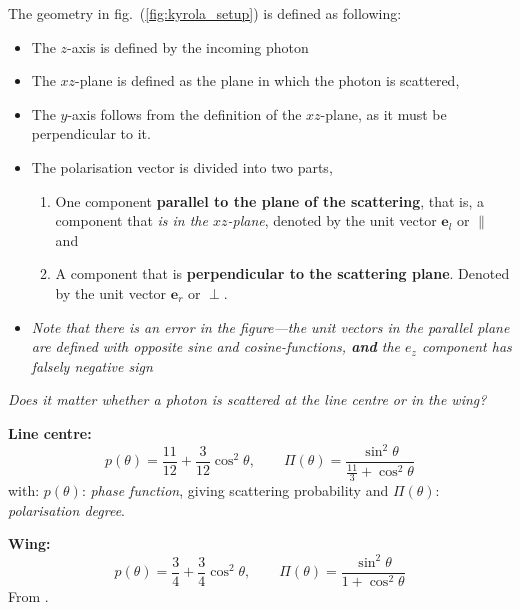 \documentclass[ignorenonframetext]{beamer}
\begin{document}
The geometry in fig.~(\ref{fig:kyrola_setup}) is defined as following:
\begin{itemize}
    \item The $z$-axis is defined by the incoming photon
    \item The $xz$-plane is defined as the plane in which the photon is scattered,
    \item The $y$-axis follows from the definition of the $xz$-plane, as it must be perpendicular to it. 
    \item The polarisation vector is divided into two parts,
        \begin{enumerate}
            \item One component \textbf{parallel to the plane of the scattering}, that is, a component that \textit{is in the $xz$-plane}, denoted by the unit vector $\mathbf{e}_l$ or $\parallel$ and
            \item A component that is \textbf{perpendicular to the scattering plane}. Denoted by the unit vector $\mathbf{e}_r$ or $\perp$.
        \end{enumerate}
    \item \textit{Note that there is an error in the figure---the unit vectors in the parallel plane are defined with opposite sine and cosine-functions, \textbf{and} the $e_z$ component has falsely negative sign}
\end{itemize}

\begin{frame}
    \begin{center}
    \textit{Does it matter whether a photon is scattered at the line centre or in the wing?}
    \end{center}
\pause
\textbf{Line centre:}
\begin{equation}
    p(\theta) = \frac{11}{12} + \frac{3}{12} \cos^2 \theta, \qquad
    \Pi(\theta) = \frac{\sin^2 \theta}{\frac{11}{3} + \cos^2 \theta}
    \label{eq:resonance}
\end{equation}
with: $p(\theta)$: \textit{phase function}, giving scattering probability and $\Pi(\theta)$: \textit{polarisation degree}.

\pause
\textbf{Wing:}
\begin{equation}
    p(\theta) = \frac{3}{4} + \frac{3}{4} \cos^2 \theta, \qquad
    \Pi(\theta) = \frac{\sin^2\theta}{1 + \cos^2 \theta}
    \label{eq:wing}
\end{equation}
 From .
    
\end{frame}
\end{document}
